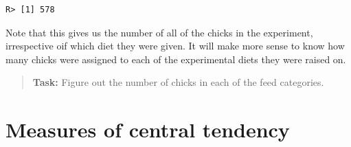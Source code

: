 \documentclass[english,10pt,a4paper,oneside]{book}
\theoremstyle{definition}
\theoremstyle{definition}
\theoremstyle{definition}
\theoremstyle{remark}
\begin{document}
\begin{verbatim}
R> [1] 578
\end{verbatim}

Note that this gives us the number of all of the chicks in the
experiment, irrespective oif which diet they were given. It will make
more sense to know how many chicks were assigned to each of the
experimental diets they were raised on.

\begin{quote}
\textbf{Task:} Figure out the number of chicks in each of the feed
categories.
\end{quote}

\section{Measures of central
tendency}\label{measures-of-central-tendency}
\end{document}

